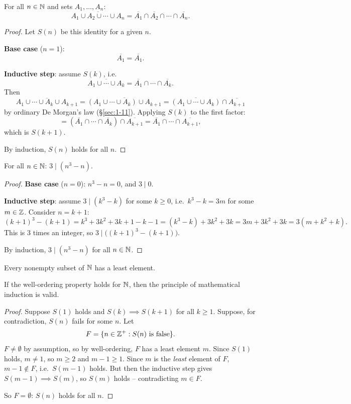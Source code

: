 \bigskip
\begin{theorem}
For all $n \in \mathbb{N}$ and sets $A_1,\dots,A_n$:
\[
\overline{A_1 \cup A_2 \cup \cdots \cup A_n} = \overline{A_1} \cap \overline{A_2} \cap \cdots \cap \overline{A_n}.
\]
\end{theorem}
\begin{proof}
Let $S(n)$ be this identity for a given $n$.

\textbf{Base case} ($n=1$):
\[
\overline{A_1} = \overline{A_1}.
\]

\textbf{Inductive step}: assume $S(k)$, i.e.
\[
\overline{A_1\cup\cdots\cup A_k} = \overline{A_1}\cap\cdots\cap\overline{A_k}.
\]
Then
\[
\overline{A_1\cup\cdots\cup A_k \cup A_{k+1}} = \overline{(A_1\cup\cdots\cup A_k) \cup A_{k+1}} = \overline{(A_1\cup\cdots\cup A_k)} \cap \overline{A_{k+1}}
\]
by ordinary De Morgan's law (\S\ref{sec:1-11}). Applying $S(k)$ to the first factor:
\[
= (\overline{A_1}\cap\cdots\cap\overline{A_k})\cap\overline{A_{k+1}} = \overline{A_1}\cap\cdots\cap\overline{A_{k+1}},
\]
which is $S(k+1)$.

By induction, $S(n)$ holds for all $n$.
\end{proof}

\bigskip
\begin{example}[$3\mid n^3-n$]
For all $n\in\mathbb{N}$: $3 \mid (n^3-n)$.
\end{example}
\begin{proof}
\textbf{Base case} ($n=0$): $n^3-n=0$, and $3\mid 0$.

\textbf{Inductive step}: assume $3\mid(k^3-k)$ for some $k\ge0$, i.e.\ $k^3-k=3m$ for some $m\in\mathbb{Z}$. Consider $n=k+1$:
\[
(k+1)^3-(k+1) = k^3+3k^2+3k+1-k-1 = (k^3-k) + 3k^2+3k = 3m+3k^2+3k = 3(m+k^2+k).
\]
This is $3$ times an integer, so $3\mid\big((k+1)^3-(k+1)\big)$.

By induction, $3\mid(n^3-n)$ for all $n\in\mathbb{N}$.
\end{proof}

\bigskip
\begin{definition}
Every nonempty subset of $\mathbb{N}$ has a least element.
\end{definition}

\begin{theorem}
If the well-ordering property holds for $\mathbb{N}$, then the principle of mathematical induction is valid.
\end{theorem}
\begin{proof}
Suppose $S(1)$ holds and $S(k)\implies S(k+1)$ for all $k\ge1$. Suppose, for contradiction, $S(n)$ fails for some $n$. Let
\[
F = \{n\in\mathbb{Z}^+ : S(n) \text{ is false}\}.
\]
$F\neq\emptyset$ by assumption, so by well-ordering, $F$ has a least element $m$. Since $S(1)$ holds, $m\neq1$, so $m\ge2$ and $m-1\ge1$. Since $m$ is the \emph{least} element of $F$, $m-1\notin F$, i.e.\ $S(m-1)$ holds. But then the inductive step gives $S(m-1)\implies S(m)$, so $S(m)$ holds -- contradicting $m\in F$.

So $F=\emptyset$: $S(n)$ holds for all $n$.
\end{proof}

